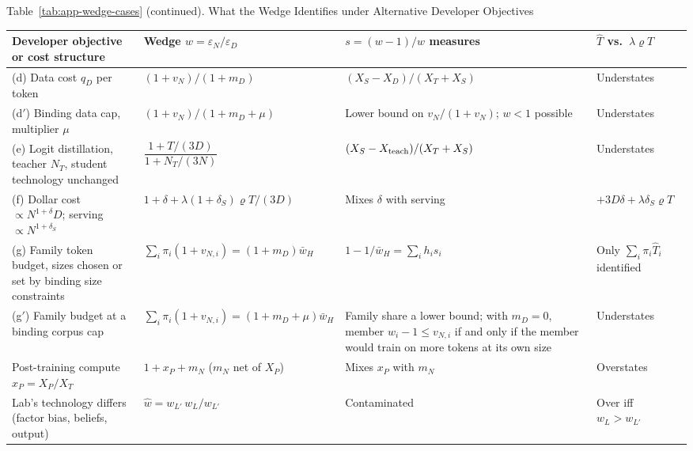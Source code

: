 \begin{table}[tp]
\centering
{\captionstyle\captionsize Table~\ref{tab:app-wedge-cases} (continued). What the Wedge Identifies under Alternative Developer
Objectives\par}
\vspace{7pt}
\footnotesize
\setlength{\tabcolsep}{3pt}
\begin{tabular}{@{}>{\raggedright\arraybackslash}p{} >{\raggedright\arraybackslash}p{} >{\raggedright\arraybackslash}p{} >{\raggedright\arraybackslash}p{}@{}}
\toprule
Developer objective or cost structure & Wedge $w=\varepsilon_N/\varepsilon_D$ & $s=(w-1)/w$ measures & $\hat T$ vs.\ $\lambda\varrho T$ \\
\midrule
(d) Data cost $q_D$ per token & $(1+v_N)/(1+m_D)$ & $(X_S-X_D)/(X_T+X_S)$ & Understates \\
(d$'$) Binding data cap, multiplier $\mu$ & $(1+v_N)/(1+m_D+\mu)$ & Lower bound on $v_N/(1+v_N)$; $w<1$ possible & Understates \\
(e) Logit distillation, teacher $N_T$, student technology unchanged & $\dfrac{1+T/(3D)}{1+N_T/(3N)}$ & $(X_S-X_{\rm teach})/(X_T+X_S)$ & Understates \\
(f) Dollar cost $\propto N^{1+\delta}D$; serving $\propto N^{1+\delta_S}$ & $1+\delta+\lambda(1+\delta_S)\varrho T/(3D)$ & Mixes $\delta$ with serving & $+3D\delta+\lambda\delta_S\varrho T$ \\
(g) Family token budget, sizes chosen or set by binding size constraints & $\sum_i\pi_i(1+v_{N,i})=(1+m_D)\bar w_H$ & $1-1/\bar w_H=\sum_ih_is_i$ & Only $\sum_i\pi_i\hat T_i$ identified \\
(g$'$) Family budget at a binding corpus cap & $\sum_i\pi_i(1+v_{N,i})=(1+m_D+\mu)\bar w_H$ & Family share a lower bound; with $m_D=0$, member $w_i-1\le v_{N,i}$ if and only if the member would train on more tokens at its own size & Understates \\
Post-training compute $x_P=X_P/X_T$ & $1+x_P+m_N$ ($m_N$ net of $X_P$) & Mixes $x_P$ with $m_N$ & Overstates \\
Lab's technology differs (factor bias, beliefs, output) & $\hat w=w_{L'}\,w_L/w_{L'}$ & Contaminated & Over iff $w_L>w_{L'}$ \\
\bottomrule
\end{tabular}
\par\smallskip

\end{table}
